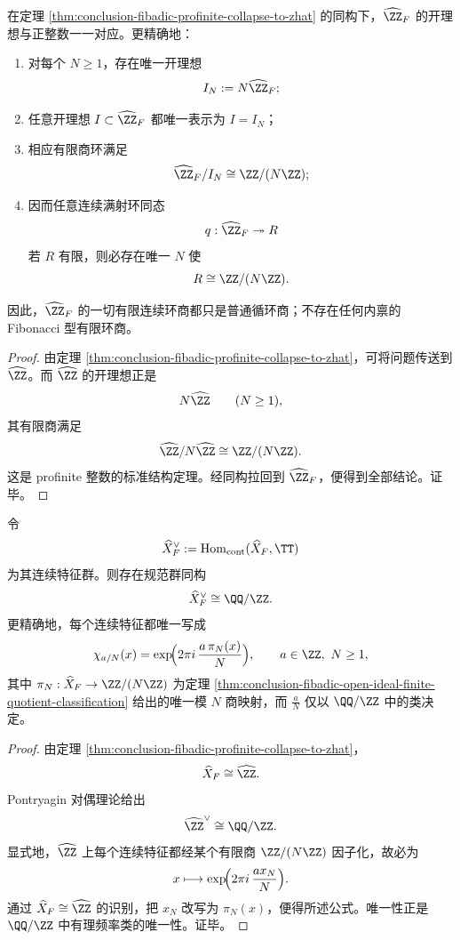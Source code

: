 \begin{theorem}[有限商刚性与开理想的算术分类]\label{thm:conclusion-fibadic-open-ideal-finite-quotient-classification}
在定理 \ref{thm:conclusion-fibadic-profinite-collapse-to-zhat} 的同构下，\(\widehat{\ZZ}_F\) 的开理想与正整数一一对应。更精确地：
\begin{enumerate}
  \item 对每个 \(N\ge 1\)，存在唯一开理想
  \[
  I_N:=N\widehat{\ZZ}_F;
  \]
  \item 任意开理想 \(I\subset \widehat{\ZZ}_F\) 都唯一表示为 \(I=I_N\)；
  \item 相应有限商环满足
  \[
  \widehat{\ZZ}_F/I_N\cong \ZZ/(N\ZZ);
  \]
  \item 因而任意连续满射环同态
  \[
  q:\widehat{\ZZ}_F\twoheadrightarrow R
  \]
  若 \(R\) 有限，则必存在唯一 \(N\) 使
  \[
  R\cong \ZZ/(N\ZZ).
  \]
\end{enumerate}
因此，\(\widehat{\ZZ}_F\) 的一切有限连续环商都只是普通循环商；不存在任何内禀的 Fibonacci 型有限环商。
\end{theorem}
\begin{proof}
由定理 \ref{thm:conclusion-fibadic-profinite-collapse-to-zhat}，可将问题传送到 \(\widehat{\ZZ}\)。而 \(\widehat{\ZZ}\) 的开理想正是
\[
N\widehat{\ZZ}\qquad (N\ge 1),
\]
其有限商满足
\[
\widehat{\ZZ}/N\widehat{\ZZ}\cong \ZZ/(N\ZZ).
\]
这是 profinite 整数的标准结构定理。经同构拉回到 \(\widehat{\ZZ}_F\)，便得到全部结论。证毕。
\end{proof}

\begin{theorem}\label{thm:conclusion-fibadic-address-pontryagin-dual-qmodz}
令
\[
\widehat X_F^\vee:=\operatorname{Hom}_{\mathrm{cont}}(\widehat X_F,\TT)
\]
为其连续特征群。则存在规范群同构
\[
\widehat X_F^\vee\cong \QQ/\ZZ.
\]
更精确地，每个连续特征都唯一写成
\[
\chi_{a/N}(x)
=
\exp\!\Bigl(2\pi i\,\frac{a\,\pi_N(x)}{N}\Bigr),
\qquad
a\in\ZZ,\ N\ge 1,
\]
其中 \(\pi_N:\widehat X_F\to \ZZ/(N\ZZ)\) 为定理 \ref{thm:conclusion-fibadic-open-ideal-finite-quotient-classification} 给出的唯一模 \(N\) 商映射，而 \(\frac{a}{N}\) 仅以 \(\QQ/\ZZ\) 中的类决定。
\end{theorem}
\begin{proof}
由定理 \ref{thm:conclusion-fibadic-profinite-collapse-to-zhat}，
\[
\widehat X_F\cong \widehat{\ZZ}.
\]
Pontryagin 对偶理论给出
\[
\widehat{\ZZ}^\vee\cong \QQ/\ZZ.
\]
显式地，\(\widehat{\ZZ}\) 上每个连续特征都经某个有限商 \(\ZZ/(N\ZZ)\) 因子化，故必为
\[
x\longmapsto \exp\!\Bigl(2\pi i\,\frac{a x_N}{N}\Bigr).
\]
通过 \(\widehat X_F\cong \widehat{\ZZ}\) 的识别，把 \(x_N\) 改写为 \(\pi_N(x)\)，便得所述公式。唯一性正是 \(\QQ/\ZZ\) 中有理频率类的唯一性。证毕。
\end{proof}

